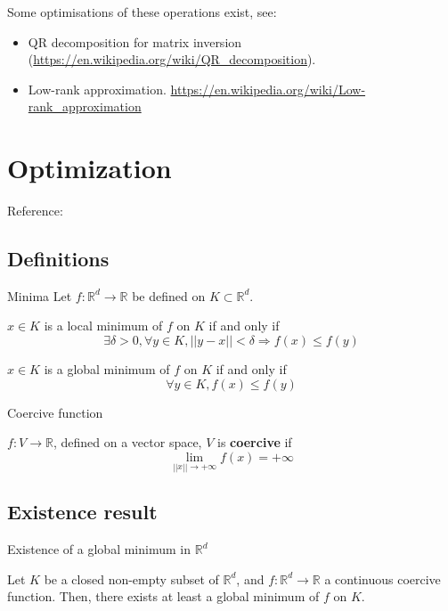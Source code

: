 \documentclass[
10pt, %
a4paper, %
oneside, %
headinclude,footinclude, %
BCOR5mm, %
]{scrartcl}
\begin{document}
Some optimisations of these operations exist, see:
\begin{itemize}
    \item QR decomposition for matrix inversion (\url{https://en.wikipedia.org/wiki/QR_decomposition}).
    \item Low-rank approximation. \url{https://en.wikipedia.org/wiki/Low-rank_approximation} 
\end{itemize}

\section{\large\color{Blue}Optimization}

Reference: \cite[]{Allaire2012} 

\subsection{\large\color{MidnightBlue}Definitions}

\begin{definition}{Minima}
    Let $f: \mathbb{R}^d\rightarrow \mathbb{R}$ be defined on $K\subset \mathbb{R}^d$.

    $x\in K$ is a local minimum of $f$ on $K$ if and only if
    \begin{equation*}
	\exists \delta>0, \forall y\in K, ||y-x||<\delta \Rightarrow f(x)\leq f(y)
    \end{equation*}

    $x\in K$ is a global minimum of $f$ on $K$ if and only if
    \begin{equation*}
	\forall y\in K, f(x)\leq f(y)
    \end{equation*}
\end{definition}

\begin{definition}{Coercive function}

    $f:V\rightarrow \mathbb{R} $, defined on a vector space, $V$ is \textbf{{coercive}} if 
    \begin{equation*}
	\lim_{||x||\rightarrow +\infty}f(x)=+\infty
    \end{equation*}
\end{definition}

\subsection{\large\color{MidnightBlue}Existence result}

\begin{theorem}{Existence of a global minimum in $\mathbb{R}^d$}

    Let $K$ be a closed non-empty subset of $ \mathbb{R}^d$, and $f: \mathbb{R}^d\rightarrow \mathbb{R} $ a continuous coercive function. Then, there exists at least a global minimum of $f$ on $K$.
\end{theorem}
\end{document}
